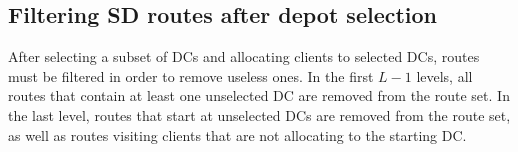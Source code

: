 \documentclass[a4paper,10pt]{article}
\begin{document}
\begin{linenumbers}
\newpage

\subsection{Filtering SD routes after depot selection}

After selecting a subset of DCs and allocating clients to selected DCs, routes must be filtered in order to remove useless ones. 
In the first $L-1$ levels, all routes that contain at least one unselected DC are removed from the route set. 
In the last level, routes that start at unselected DCs are removed from the route set, as well as routes visiting clients that are not allocating to the starting DC. 


%
%		
%		
%
%
%
%
%		
%				




\end{linenumbers}
\end{document}
